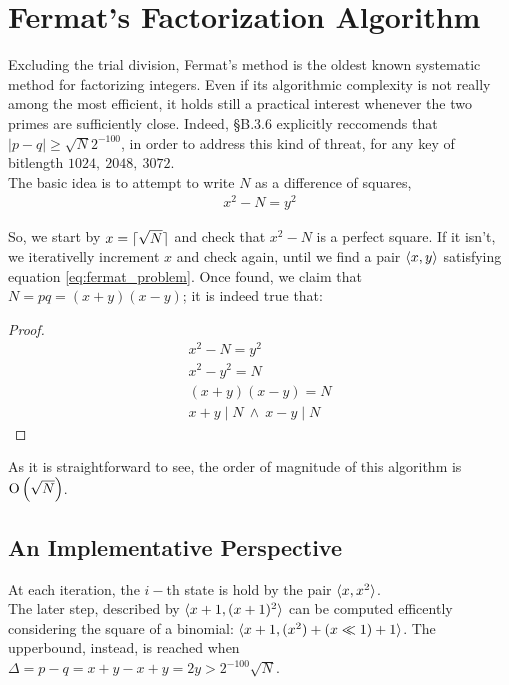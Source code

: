 \chapter{Fermat's Factorization Algorithm \label{chap:fermat}}

Excluding the trial division, Fermat's method is the oldest known systematic
method for factorizing integers. Even if its algorithmic complexity is not
really among the most efficient, it holds still a practical interest whenever
the two primes are sufficiently close.
Indeed, \cite{DSS2009} \S B.3.6 explicitly reccomends that $|p-q| \geq \sqrt{N}2^{-100}$,
in order to address this kind of threat, for any key of bitlength $1024,\ 2048,\ 3072$.\\
The basic idea is to attempt to write $N$ as a difference of squares,
\begin{align}
\label{eq:fermat_problem}
x^2 - N = y^2
\end{align}

So, we start by $x = \lceil\sqrt{N}\rceil$ and check that $x^2-N$ is a perfect
square. If it isn't, we iterativelly increment $x$ and check again, until we
find a pair $\langle x, y\rangle$ satisfying equation \ref{eq:fermat_problem}.
Once found, we claim that $N = pq = (x+y)(x-y)$; it is indeed true that:
\begin{proof}
  \label{proof:fermat}
  \begin{align*}
    x^2 - N = y^2 \\
    x^2 - y^2 = N \\
    (x+y)(x-y) = N \\
    x+y \mid N \ \land \  x-y \mid N
  \end{align*}
\end{proof}

As it is straightforward to see, the order of magnitude of this algorithm is
$\operatorname{O}\left(\sqrt{N}\right)$.

\section{An Implementative Perspective}

At each iteration, the $i-$th state is hold by the pair $\langle x, x^2\rangle$.\\
The later step, described by $\langle x+1, (x+1)^2\rangle$ can be computed efficently
considering the square of a binomial: $\langle x+1, (x^2) + (x \ll 1) + 1\rangle$.
The upperbound, instead, is reached when
$ \Delta = p - q  = x + y - x + y = 2y > 2^{-100}\sqrt{N}$.

